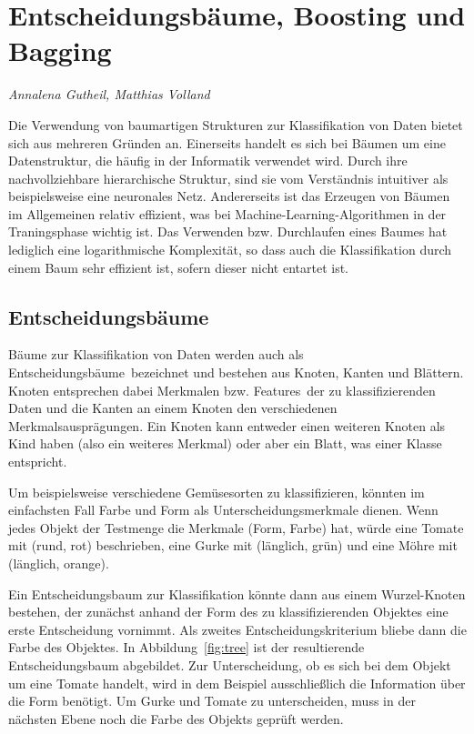 \section{Entscheidungsbäume, Boosting und Bagging}
\label{mainsec:trees}
\textit{Annalena Gutheil, Matthias Volland}

Die Verwendung von baumartigen Strukturen zur Klassifikation von Daten bietet sich aus mehreren Gründen an. 
Einerseits handelt es sich bei Bäumen um eine Datenstruktur, die häufig in der Informatik verwendet wird. Durch ihre nachvollziehbare hierarchische Struktur, sind sie vom Verständnis intuitiver als beispielsweise eine neuronales Netz.
Andererseits ist das Erzeugen von Bäumen im Allgemeinen relativ effizient, was bei Machine-Learning-Algorithmen 
in der Traningsphase wichtig ist. Das Verwenden bzw. Durchlaufen eines Baumes hat lediglich eine logarithmische Komplexität, 
so dass auch die Klassifikation durch einem Baum sehr effizient ist, sofern dieser nicht entartet ist. 

\subsection*{Entscheidungsbäume}

Bäume zur Klassifikation von Daten werden auch als \glqq Entscheidungsbäume\grqq\ bezeichnet und bestehen aus Knoten, Kanten und Blättern. Knoten entsprechen dabei Merkmalen bzw. \glqq Features\grqq\ der zu klassifizierenden Daten und die Kanten an einem Knoten den verschiedenen Merkmalsausprägungen. 
Ein Knoten kann entweder einen weiteren Knoten als Kind haben (also ein weiteres Merkmal) oder aber ein Blatt, was einer Klasse entspricht.

Um beispielsweise verschiedene Gemüsesorten zu klassifizieren, könnten im einfachsten Fall Farbe und Form als Unterscheidungsmerkmale dienen. Wenn jedes Objekt der Testmenge die Merkmale (Form, Farbe) hat, würde eine Tomate mit (rund, rot) beschrieben, eine Gurke mit (länglich, grün) und eine Möhre mit (länglich, orange).

Ein Entscheidungsbaum zur Klassifikation könnte dann aus einem Wurzel-Knoten bestehen, der zunächst anhand der Form 
des zu klassifizierenden Objektes eine erste Entscheidung vornimmt. Als zweites Entscheidungskriterium bliebe dann die Farbe des Objektes. In Abbildung~\ref{fig:tree} ist der resultierende Entscheidungsbaum abgebildet. Zur Unterscheidung, ob es sich bei dem Objekt um eine Tomate handelt, wird in dem Beispiel ausschließlich die Information über die Form benötigt. Um Gurke und Tomate zu unterscheiden, muss in der nächsten Ebene noch die Farbe des Objekts geprüft werden.

